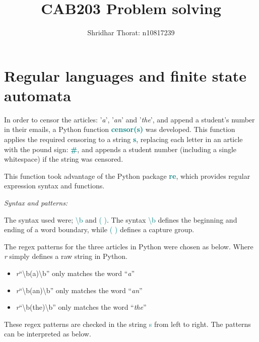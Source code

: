 \documentclass[a4paper]{article}
\author{Shridhar Thorat: n10817239}
\title{CAB203 Problem solving}
\begin{document}
\maketitle
\date{}

\section{Regular languages and finite state automata}
In order to censor the articles: '\emph{a}', '\emph{an}' and  '\emph{the}', and append a student's number in their emails, a Python function \textcolor{teal}{\textbf{censor(s)}} was developed. This function applies the required censoring to a string \textcolor{teal}{\textbf{s}}, replacing each letter in an article with the pound sign: \textcolor{teal}{\textbf{\#}}, and appends a student number (including a single whitespace) if the string was censored.

This function took advantage of the Python package \textcolor{teal}{\textbf{re}}, which provides regular expression syntax and functions. 
\vspace{5mm}

\noindent
\emph{Syntax and patterns:}
\vspace{2mm}

\noindent
The syntax used were; \textcolor{teal}{\textbackslash b} and \textcolor{teal}{( )}. The syntax \textcolor{teal}{\textbackslash b} defines the beginning and ending of a word boundary, while \textcolor{teal}{( )} defines a capture group.

The regex patterns for the three articles in Python were chosen as below. Where \emph{r} simply defines a raw string in Python.
\begin{center}
    \begin{minipage}[c]{1\linewidth}
        \begin{itemize}
            \item \emph{r}\enquote{\textbackslash b(a)\textbackslash b} only matches the word \enquote{\emph{a}}
            \item \emph{r}\enquote{\textbackslash b(an)\textbackslash b} only matches the word \enquote{\emph{an}}
            \item \emph{r}\enquote{\textbackslash b(the)\textbackslash b} only matches the word \enquote{\emph{the}}
        \end{itemize} 
    \end{minipage}
\end{center}
These regex patterns are checked in the string \textcolor{teal}{s} from left to right. The patterns can be interpreted as below.
\end{document}
